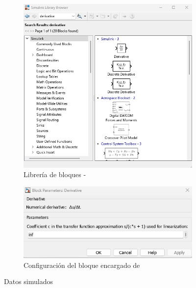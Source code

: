 \begin{figure}[htbp]
    \centering
    \begin{subfigure}[b]{0.35\textwidth}
        \centering
        \includegraphics[width=\textwidth]{fig/Capitulo5/Caso_de_estudio_PID/lib_derivative.png}
        \caption{Librería de bloques -}
        \label{fig:bias_sim}
    \end{subfigure}
    \hfill
    \begin{subfigure}[b]{0.45\textwidth}
        \centering
        \includegraphics[width=\textwidth]{fig/Capitulo5/Caso_de_estudio_PID/config_derivative.png}
        \caption{Configuración del bloque encargado de }
        \label{fig:oe_sim}
    \end{subfigure}
    \caption{Datos simulados}
    \label{fig:data_simulated}
\end{figure}

